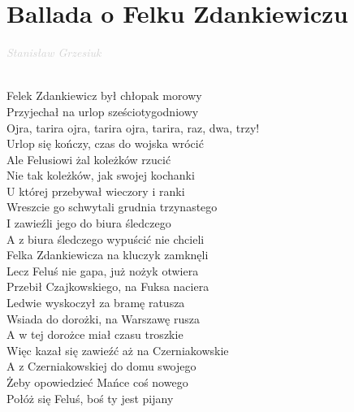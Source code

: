 \documentclass[a5paper, 10pt]{book}
\begin{document}
\newpage
\section{Ballada o Felku Zdankiewiczu}\textcolor{lightgray}{\textit{Stanisław Grzesiuk}}\\~\\
\begin{minipage}[t]{0.8\textwidth}
  Felek Zdankiewicz był chłopak morowy\\
  Przyjechał na urlop sześciotygodniowy\vspace*{2.2mm}\\
  \hspace*{5mm}Ojra, tarira ojra, tarira ojra, tarira, raz, dwa, trzy!\vspace*{2.2mm}\\
  Urlop się kończy, czas do wojska wrócić\\
  Ale Felusiowi żal koleżków rzucić\vspace*{1.8mm}\\
  Nie tak koleżków, jak swojej kochanki\\
  U której przebywał wieczory i ranki\vspace*{1.8mm}\\
  Wreszcie go schwytali grudnia trzynastego\\
  I zawieźli jego do biura śledczego\vspace*{1.8mm}\\
  A z biura śledczego wypuścić nie chcieli\\
  Felka Zdankiewicza na kluczyk zamknęli\vspace*{1.8mm}\\
  Lecz Feluś nie gapa, już nożyk otwiera\\
  Przebił Czajkowskiego, na Fuksa naciera\vspace*{1.8mm}\\
  Ledwie wyskoczył za bramę ratusza\\
  Wsiada do dorożki, na Warszawę rusza\vspace*{1.8mm}\\
  A w tej dorożce miał czasu troszkie\\
  Więc kazał się zawieźć aż na Czerniakowskie\vspace*{1.8mm}\\
  A z Czerniakowskiej do domu swojego\\
  Żeby opowiedzieć Mańce coś nowego\vspace*{1.8mm}\\
  Połóż się Feluś, boś ty jest pijany\\

\end{minipage}
\end{document}
